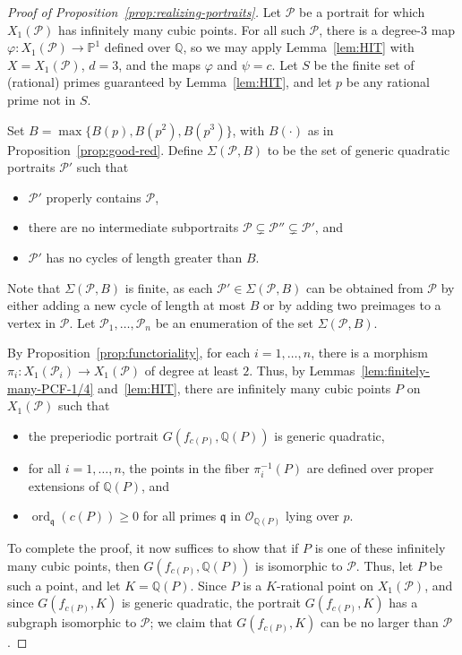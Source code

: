 \documentclass[12pt]{amsart}
\theoremstyle{definition}
\newcommand{\bbP}{\mathbb{P}}
\newcommand{\bbQ}{\mathbb{Q}}
\newcommand{\calO}{\mathcal{O}}
\newcommand{\calP}{\mathcal{P}}
\newcommand{\frakq}{\mathfrak{q}}
\newcommand{\ord}{\operatorname{ord}}
\numberwithin{equation}{section}
\begin{document}
\begin{proof}[Proof of Proposition~\ref{prop:realizing-portraits}]
Let $\calP$ be a portrait for which $X_1(\calP)$ has infinitely many cubic points. For all such $\calP$, there is a degree-$3$ map $\varphi : X_1(\calP) \to \bbP^1$ defined over $\bbQ$, so we may apply Lemma~\ref{lem:HIT} with $X = X_1(\calP)$, $d = 3$, and the maps $\varphi$ and $\psi = c$. Let $S$ be the finite set of (rational) primes guaranteed by Lemma~\ref{lem:HIT}, and let $p$ be any rational prime not in $S$.

Set $B = \max\{B(p), B(p^2), B(p^3)\}$, with $B(\cdot)$ as in Proposition~\ref{prop:good-red}.
Define $\Sigma(\calP, B)$ to be the set of generic quadratic portraits $\calP'$ such that
    \begin{itemize}
        \item $\calP'$ properly contains $\calP$,
        \item there are no intermediate subportraits $\calP \subsetneq \calP'' \subsetneq \calP'$, and
        \item $\calP'$ has no cycles of length greater than $B$.
    \end{itemize}
Note that $\Sigma(\calP, B)$ is finite, as each $\calP' \in \Sigma(\calP, B)$ can be obtained from $\calP$ by either adding a new cycle of length at most $B$ or by adding two preimages to a vertex in $\calP$. Let $\calP_1,\ldots,\calP_n$ be an enumeration of the set $\Sigma(\calP, B)$.

By Proposition~\ref{prop:functoriality}, for each $i = 1,\ldots,n$, there is a morphism $\pi_i : X_1(\calP_i) \to X_1(\calP)$ of degree at least $2$. Thus, by Lemmas~\ref{lem:finitely-many-PCF-1/4} and~\ref{lem:HIT}, there are infinitely many cubic points $P$ on $X_1(\calP)$ such that
    \begin{itemize}
        \item the preperiodic portrait $G(f_{c(P)}, \bbQ(P))$ is generic quadratic,
        \item for all $i = 1,\ldots,n$, the points in the fiber $\pi_i^{-1}(P)$ are defined over proper extensions of $\bbQ(P)$, and
        \item $\ord_\frakq(c(P)) \ge 0$ for all primes $\frakq$ in $\calO_{\bbQ(P)}$ lying over $p$.
    \end{itemize}
    
To complete the proof, it now suffices to show that if $P$ is one of these infinitely many cubic points, then $G(f_{c(P)}, \bbQ(P))$ is isomorphic to $\calP$. Thus, let $P$ be such a point, and let $K = \bbQ(P)$. Since $P$ is a $K$-rational point on $X_1(\calP)$, and since $G(f_{c(P)},K)$ is generic quadratic, the portrait $G(f_{c(P)}, K)$ has a subgraph isomorphic to $\calP$; we claim that $G(f_{c(P)}, K)$ can be no larger than $\calP$.


\end{proof}
\end{document}
